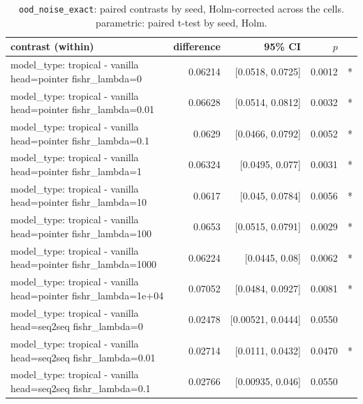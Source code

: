 \documentclass[10pt]{article}
\makeatletter
\newcommand{\stackcell}[1]{\begin{tabular}[t]{@{}l@{}}#1\end{tabular}}
\makeatother
\begin{document}
{\small
\begin{longtable}{lrrrl}
\caption{\texttt{ood\_noise\_exact}: paired contrasts by seed, Holm-corrected across the cells. parametric: paired t-test by seed, Holm.}\label{tab:paired-ood_noise_exact}\\
\toprule
contrast (within) & difference & 95\% CI & $p$ & \\
\midrule
\endhead
\stackcell{model\_type: tropical - vanilla\\\footnotesize head=pointer fishr\_lambda=0 } & 0.06214 & [0.0518, 0.0725] & 0.0012 & *\\
\stackcell{model\_type: tropical - vanilla\\\footnotesize head=pointer fishr\_lambda=0.01 } & 0.06628 & [0.0514, 0.0812] & 0.0032 & *\\
\stackcell{model\_type: tropical - vanilla\\\footnotesize head=pointer fishr\_lambda=0.1 } & 0.0629 & [0.0466, 0.0792] & 0.0052 & *\\
\stackcell{model\_type: tropical - vanilla\\\footnotesize head=pointer fishr\_lambda=1 } & 0.06324 & [0.0495, 0.077] & 0.0031 & *\\
\stackcell{model\_type: tropical - vanilla\\\footnotesize head=pointer fishr\_lambda=10 } & 0.0617 & [0.045, 0.0784] & 0.0056 & *\\
\stackcell{model\_type: tropical - vanilla\\\footnotesize head=pointer fishr\_lambda=100 } & 0.0653 & [0.0515, 0.0791] & 0.0029 & *\\
\stackcell{model\_type: tropical - vanilla\\\footnotesize head=pointer fishr\_lambda=1000 } & 0.06224 & [0.0445, 0.08] & 0.0062 & *\\
\stackcell{model\_type: tropical - vanilla\\\footnotesize head=pointer fishr\_lambda=1e+04 } & 0.07052 & [0.0484, 0.0927] & 0.0081 & *\\
\stackcell{model\_type: tropical - vanilla\\\footnotesize head=seq2seq fishr\_lambda=0 } & 0.02478 & [0.00521, 0.0444] & 0.0550 & \\
\stackcell{model\_type: tropical - vanilla\\\footnotesize head=seq2seq fishr\_lambda=0.01 } & 0.02714 & [0.0111, 0.0432] & 0.0470 & *\\
\stackcell{model\_type: tropical - vanilla\\\footnotesize head=seq2seq fishr\_lambda=0.1 } & 0.02766 & [0.00935, 0.046] & 0.0550 & \\

\end{longtable}}
\end{document}
